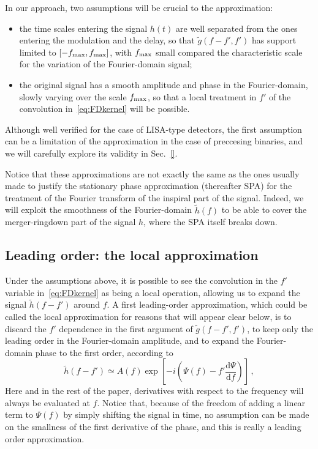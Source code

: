 \documentclass[aps,showpacs,%
prd,superscriptaddress,nofootinbib]{revtex4}
\newcommand{\be}{\begin{equation}}
\newcommand{\ee}{\end{equation}}
\newcommand\ud{{\mathrm{d}}}
\begin{document}
In our approach, two assumptions will be crucial to the approximation:
\begin{itemize}
	\item the time scales entering the signal $h(t)$ are well separated from the ones entering the modulation and the delay, so that $\tilde{g}(f-f',f')$ has support limited to $[-f_{\rm max},f_{\rm max}]$, with $f_{\rm max}$ small compared the characteristic scale for the variation of the Fourier-domain signal;
	\item the original signal has a smooth amplitude and phase in the Fourier-domain, slowly varying over the scale $f_{\rm max}$, so that a local treatment in $f'$ of the convolution in~\eqref{eq:FDkernel} will be possible.
\end{itemize}
Although well verified for the case of LISA-type detectors, the first assumption can be a limitation of the approximation in the case of preccesing binaries, and we will carefully explore its validity in Sec.~\ref{}.

Notice that these approximations are not exactly the same as the ones usually made to justify the stationary phase approximation (thereafter SPA) for the treatment of the Fourier transform of the inspiral part of the signal. Indeed, we will exploit the smoothness of the Fourier-domain $\tilde{h}(f)$ to be able to cover the merger-ringdown part of the signal $h$, where the SPA itself breaks down.


\subsection{Leading order: the local approximation}
\label{subsec:LLP}

Under the assumptions above, it is possible to see the convolution in the $f'$ variable in~\eqref{eq:FDkernel} as being a local operation, allowing us to expand the signal $\tilde{h}(f-f')$ around $f$. A first leading-order approximation, which could be called the local approximation for reasons that will appear clear below, is to discard the $f'$ dependence in the first argument of $\tilde{g}(f-f', f')$, to keep only the leading order in the Fourier-domain amplitude, and to expand the Fourier-domain phase to the first order, according to
\be
	\tilde{h}(f-f') \simeq A(f) \exp\left[ -i\left( \Psi(f) - f' \frac{\ud \Psi}{\ud f} \right) \right] \,,
\ee
Here and in the rest of the paper, derivatives with respect to the frequency will always be evaluated at $f$. Notice that, because of the freedom of adding a linear term to $\Psi(f)$ by simply shifting the signal in time, no assumption can be made on the smallness of the first derivative of the phase, and this is really a leading order approximation.
\end{document}
